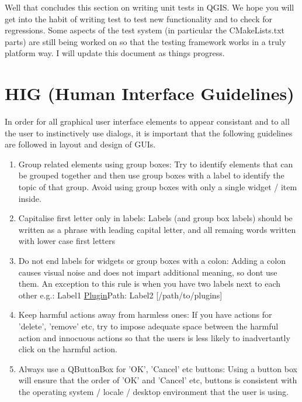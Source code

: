 Well that concludes this section on writing unit tests in QGIS. We hope you
will get into the habit of writing test to test new functionality and to check
for regressions. Some aspects of the test system (in particular the
CMakeLists.txt parts) are still being worked on so that the testing framework
works in a truly platform way. I will update this document as things
progress.

\section{HIG (Human Interface Guidelines)}
In order for all graphical user interface elements to appear consistant and to
all the user to instinctively use dialogs, it is important that the following
guidelines are followed in layout and design of GUIs.

 \begin{enumerate}
 \item Group related elements using group boxes:
   Try to identify elements that can be grouped together and then use group
   boxes with a label to identify the topic of that group.  Avoid using group
   boxes with only a single widget / item inside.
 \item Capitalise first letter only in labels:
   Labels (and group box labels) should be written as a phrase with leading
   capital letter, and all remaing words written with lower case first letters 
 \item Do not end labels for widgets or group boxes with a colon:
   Adding a colon causes visual noise and does not impart additional meaning,
   so dont use them. An exception to this rule is when you have two labels next
   to each other e.g.: Label1 \url{Plugin}{Path:} Label2 [/path/to/plugins]
 \item Keep harmful actions away from harmless ones:
   If you have actions for 'delete', 'remove' etc, try to impose adequate space
   between the harmful action and innocuous actions so that the users is less
   likely to inadvertantly click on the harmful action.
 \item Always use a QButtonBox for 'OK', 'Cancel' etc buttons:
   Using a button box will ensure that the order of 'OK' and 'Cancel' etc,
   buttons is consistent with the operating system / locale / desktop
   environment that the user is using.
 \end{enumerate}

